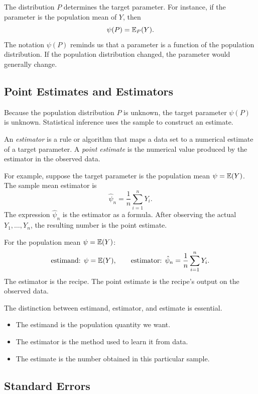 The distribution $P$ determines the target parameter. For instance, if the parameter is the population mean of $Y$, then
\[
\psi(P)=\mathbb{E}_P(Y).
\]
The notation $\psi(P)$ reminds us that a parameter is a function of the population distribution. If the population distribution changed, the parameter would generally change.

\subsection{Point Estimates and Estimators}

Because the population distribution $P$ is unknown, the target parameter $\psi(P)$ is unknown. Statistical inference uses the sample to construct an estimate.

\begin{definition}
An \emph{estimator} is a rule or algorithm that maps a data set to a numerical estimate of a target parameter. A \emph{point estimate} is the numerical value produced by the estimator in the observed data.
\end{definition}

For example, suppose the target parameter is the population mean $\psi=\mathbb{E}(Y)$. The sample mean estimator is
\[
\hat\psi_n=\frac{1}{n}\sum_{i=1}^n Y_i.
\]
The expression $\hat\psi_n$ is the estimator as a formula. After observing the actual $Y_1,\ldots,Y_n$, the resulting number is the point estimate.

\begin{estimationbox}
For the population mean $\psi=\mathbb{E}(Y)$:
\[
\text{estimand: } \psi=\mathbb{E}(Y), \qquad
\text{estimator: } \hat\psi_n=\frac{1}{n}\sum_{i=1}^n Y_i.
\]
The estimator is the recipe. The point estimate is the recipe's output on the observed data.
\end{estimationbox}

The distinction between estimand, estimator, and estimate is essential.
\begin{itemize}
  \item The estimand is the population quantity we want.
  \item The estimator is the method used to learn it from data.
  \item The estimate is the number obtained in this particular sample.
\end{itemize}

\subsection{Standard Errors}

